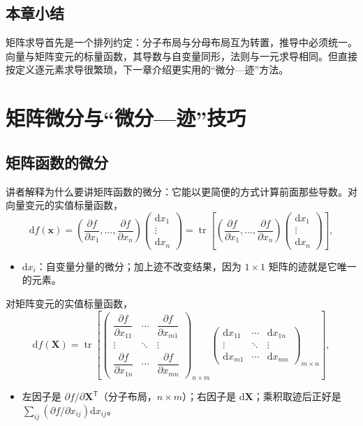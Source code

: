 \documentclass[a4paper]{article}
\begin{document}
\subsection{本章小结}

矩阵求导首先是一个排列约定：分子布局与分母布局互为转置，推导中必须统一。向量与矩阵变元的标量函数，其导数与自变量同形，法则与一元求导相同。但直接按定义逐元素求导很繁琐，下一章介绍更实用的“微分—迹”方法。

\section{矩阵微分与“微分—迹”技巧}

\subsection{矩阵函数的微分}

讲者解释为什么要讲矩阵函数的微分：它能以更简便的方式计算前面那些导数。对向量变元的实值标量函数，
\[
\mathrm df(\boldsymbol x)=\left(\frac{\partial f}{\partial x_1},\dots,\frac{\partial f}{\partial x_n}\right)\begin{pmatrix}\mathrm dx_1\\ \vdots\\ \mathrm dx_n\end{pmatrix}=\operatorname{tr}\left[\left(\frac{\partial f}{\partial x_1},\dots,\frac{\partial f}{\partial x_n}\right)\begin{pmatrix}\mathrm dx_1\\ \vdots\\ \mathrm dx_n\end{pmatrix}\right],
\]
\begin{itemize}
\item $\mathrm dx_i$：自变量分量的微分；加上迹不改变结果，因为 $1\times1$ 矩阵的迹就是它唯一的元素。
\end{itemize}
对矩阵变元的实值标量函数，
\[
\mathrm df(\boldsymbol X)=\operatorname{tr}\left[\begin{pmatrix}\dfrac{\partial f}{\partial x_{11}}&\cdots&\dfrac{\partial f}{\partial x_{m1}}\\ \vdots&\ddots&\vdots\\ \dfrac{\partial f}{\partial x_{1n}}&\cdots&\dfrac{\partial f}{\partial x_{mn}}\end{pmatrix}_{n\times m}
\begin{pmatrix}\mathrm dx_{11}&\cdots&\mathrm dx_{1n}\\ \vdots&\ddots&\vdots\\ \mathrm dx_{m1}&\cdots&\mathrm dx_{mn}\end{pmatrix}_{m\times n}\right],
\]
\begin{itemize}
\item 左因子是 $\partial f/\partial\boldsymbol X^{\mathsf T}$（分子布局，$n\times m$）；右因子是 $\mathrm d\boldsymbol X$；乘积取迹后正好是 $\sum_{ij}(\partial f/\partial x_{ij})\mathrm dx_{ij}$。
\end{itemize}
\end{document}
